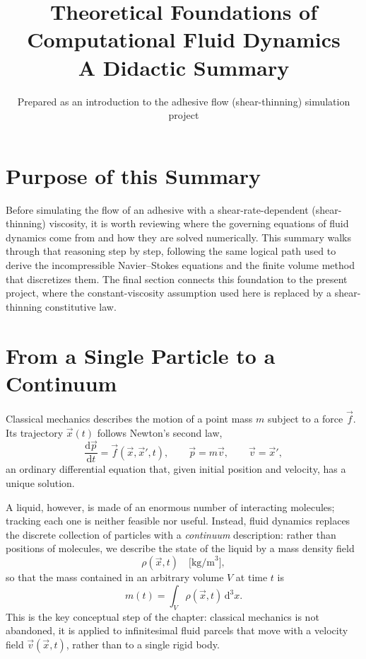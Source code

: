 \documentclass[11pt]{article}
\title{Theoretical Foundations of Computational Fluid Dynamics\\
\large A Didactic Summary}
\author{Prepared as an introduction to the adhesive flow (shear-thinning) simulation project}
\date{}
\newcommand{\vv}{\vec{v}}
\newcommand{\vx}{\vec{x}}
\newcommand{\vf}{\vec{f}}
\begin{document}
\maketitle

\section*{Purpose of this Summary}

Before simulating the flow of an adhesive with a shear-rate-dependent (shear-thinning) viscosity, it is worth reviewing where the governing equations of fluid dynamics come from and how they are solved numerically. This summary walks through that reasoning step by step, following the same logical path used to derive the incompressible Navier--Stokes equations and the finite volume method that discretizes them. The final section connects this foundation to the present project, where the constant-viscosity assumption used here is replaced by a shear-thinning constitutive law.

\section{From a Single Particle to a Continuum}

Classical mechanics describes the motion of a point mass $m$ subject to a force $\vf$. Its trajectory $\vx(t)$ follows Newton's second law,
\begin{equation}
  \frac{\mathrm{d}\vec{p}}{\mathrm{d}t} = \vf(\vx,\vx',t), \qquad \vec{p} = m\vv, \qquad \vv = \vx' ,
\end{equation}
an ordinary differential equation that, given initial position and velocity, has a unique solution.

A liquid, however, is made of an enormous number of interacting molecules; tracking each one is neither feasible nor useful. Instead, fluid dynamics replaces the discrete collection of particles with a \emph{continuum} description: rather than positions of molecules, we describe the state of the liquid by a mass density field
\begin{equation}
  \rho(\vx,t) \quad \text{[kg/m}^3\text{]},
\end{equation}
so that the mass contained in an arbitrary volume $V$ at time $t$ is
\begin{equation}
  m(t) = \int_V \rho(\vx,t)\, \mathrm{d}^3x .
\end{equation}
This is the key conceptual step of the chapter: classical mechanics is not abandoned, it is applied to infinitesimal fluid parcels that move with a velocity field $\vv(\vx,t)$, rather than to a single rigid body.
\end{document}
